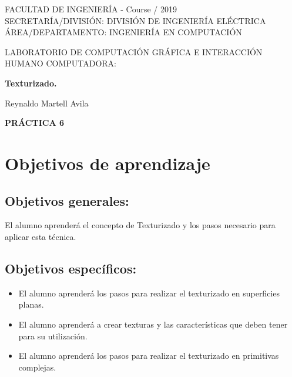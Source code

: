 \documentclass[11pt, english]{article}
\makeatletter
\newcounter{unomenos}
\gdef\@date{ Course \arabic{unomenos}/ 2019}
\makeatother
\begin{document}
\begin{titlepage}
\begin{center}
FACULTAD DE INGENIERÍA - \@date\\
\vspace*{0.15in}
SECRETARÍA/DIVISIÓN: DIVISIÓN DE INGENIERÍA ELÉCTRICA \\
ÁREA/DEPARTAMENTO: INGENIERÍA EN COMPUTACIÓN \\
\vspace*{0.4in}
\begin{large}
LABORATORIO DE COMPUTACIÓN GRÁFICA E INTERACCIÓN HUMANO COMPUTADORA:\\
\end{large}
\vspace*{0.2in}
\begin{Large}
\textbf{Texturizado.} \\
\end{Large}
\vspace*{0.3in}
\vspace*{0.3in}
\begin{large}
Reynaldo Martell Avila \\
\end{large}
\vspace*{0.5in}
\vspace*{0.5in}
\begin{large}
\textbf{PRÁCTICA 6} \\
\end{large}
\end{center}
\end{titlepage}

\newcommand{\CC}{C\nolinebreak\hspace{-.05em}\raisebox{.4ex}{\tiny\bf +}\nolinebreak\hspace{-.10em}\raisebox{.4ex}{\tiny\bf +}}
\def\CC{{C\nolinebreak[4]\hspace{-.05em}\raisebox{.4ex}{\tiny\bf ++}}}

\tableofcontents

\newpage
\section{Objetivos de aprendizaje}
\subsection{Objetivos generales:}
El alumno aprenderá el concepto de Texturizado y los pasos necesario para aplicar
esta técnica.
\subsection{Objetivos específicos:}
\begin{itemize}
\item El alumno aprenderá los pasos para realizar el texturizado en superficies planas.
\item El alumno aprenderá a crear texturas y las características que deben tener para su
utilización.
\item El alumno aprenderá los pasos para realizar el texturizado en primitivas
complejas.
\end{itemize}
\end{document}
